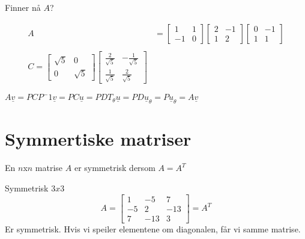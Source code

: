 \documentclass[11pt, a4paper, norsk]{article}
\begin{document}
\begin{Example}{}{}
            Finner nå $A$?

            \begin{align*}
                A &= \begin{bmatrix}
                    1 & 1 \\
                    -1 & 0
                \end{bmatrix}\begin{bmatrix}
                    2 & -1 \\
                    1 & 2
                \end{bmatrix}\begin{bmatrix}
                    0 & -1 \\
                    1 & 1
                \end{bmatrix}
                \\
                \\
                C = \begin{bmatrix}
                    \sqrt{5} & 0 \\
                    0 & \sqrt{5}
                \end{bmatrix}\begin{bmatrix}
                    \frac{2}{\sqrt{5}} & -\frac{1}{\sqrt{5}} \\
                    \frac{1}{\sqrt{5}} & \frac{2}{\sqrt{5}}
                \end{bmatrix}
            \end{align*}
        \end{Example}

        $A\underline{v} = PCP^-1\underline{v} = PC\underline{u} = PDT_{\theta}\underline{u} = PD\underline{u}_{\theta} = P\underline{u}_{\theta} = A\underline{v}$

        \section{Symmertiske matriser}
        
        \begin{Definition}{}{}
            En $n$x$n$ matrise $A$ er symmetrisk dersom $A = A^T$
        \end{Definition}

        \begin{Example}{Symmetrisk $3x3$}{}
            $$
                A = \begin{bmatrix}
                    1 & -5 & 7 \\
                    -5 & 2 & -13 \\
                    7 & -13 & 3
                \end{bmatrix} = A^T
            $$
            Er symmetrisk. Hvis vi speiler elementene om diagonalen, får vi samme matrise. 
        \end{Example}
        
\end{document}
